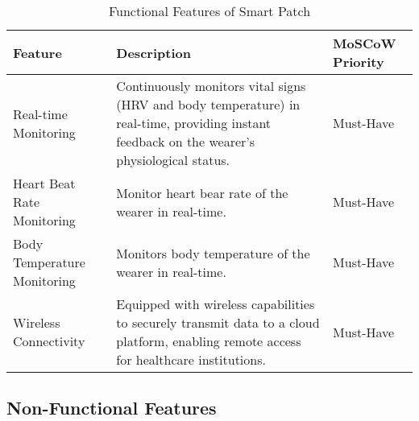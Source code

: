 \begin{table}[h]
    \centering
    \begin{tabularx}{\textwidth}{|p{3cm}|X|p{2cm}|}

         \hline

         \textbf{Feature}
         & \textbf{Description}
         & \textbf{MoSCoW Priority} \\ \hline

         Real-time Monitoring
         & Continuously monitors vital signs (HRV and body temperature) in real-time, providing instant feedback on the wearer's physiological status.
         & Must-Have \\ \hline

         Heart Beat Rate Monitoring
         & Monitor heart bear rate of the wearer in real-time.
         & Must-Have \\ \hline

         Body Temperature Monitoring
         & Monitors body temperature of the wearer in real-time.
         & Must-Have \\ \hline

         Wireless Connectivity 
         & Equipped with wireless capabilities to securely transmit data to a cloud platform, enabling remote access for healthcare institutions.
         & Must-Have \\ \hline
         
    \end{tabularx}
    \caption{Functional Features of Smart Patch}
    \label{table:functional-sp}
\end{table}

\newpage
\subsection{Non-Functional Features}

